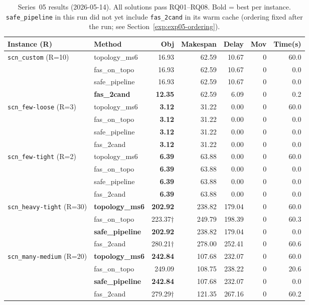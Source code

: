 \begin{table}[h]
\centering
\caption{Series~05 results (2026-05-14).  All solutions pass RQ01--RQ08.
Bold = best per instance.
\texttt{safe\_pipeline} in this run did not yet include \texttt{fas\_2cand}
in its warm cache (ordering fixed after the run; see Section~\ref{exp:exp05-ordering}).}
\label{tab:exp05}
\begin{tabular}{llrrrrr}
\toprule
Instance (R) & Method & Obj & Makespan & Delay & Mov & Time(s) \\
\midrule
\multirow{4}{*}{\texttt{scn\_custom} (R=10)}
 & topology\_ms6  & 16.93          &  62.59 &  10.67 & 0 & 60.0 \\
 & fas\_on\_topo  & 16.93          &  62.59 &  10.67 & 0 &  0.0 \\
 & safe\_pipeline & 16.93          &  62.59 &  10.67 & 0 &  0.0 \\
 & \textbf{fas\_2cand}  & \textbf{12.35} &  62.59 &   6.09 & 0 &  0.2 \\
\midrule
\multirow{4}{*}{\texttt{scn\_few-loose} (R=3)}
 & topology\_ms6  & \textbf{3.12}  &  31.22 &   0.00 & 0 & 60.0 \\
 & fas\_on\_topo  & \textbf{3.12}  &  31.22 &   0.00 & 0 &  0.0 \\
 & safe\_pipeline & \textbf{3.12}  &  31.22 &   0.00 & 0 &  0.0 \\
 & fas\_2cand     & \textbf{3.12}  &  31.22 &   0.00 & 0 &  0.0 \\
\midrule
\multirow{4}{*}{\texttt{scn\_few-tight} (R=2)}
 & topology\_ms6  & \textbf{6.39}  &  63.88 &   0.00 & 0 & 60.0 \\
 & fas\_on\_topo  & \textbf{6.39}  &  63.88 &   0.00 & 0 &  0.0 \\
 & safe\_pipeline & \textbf{6.39}  &  63.88 &   0.00 & 0 &  0.0 \\
 & fas\_2cand     & \textbf{6.39}  &  63.88 &   0.00 & 0 &  0.0 \\
\midrule
\multirow{4}{*}{\texttt{scn\_heavy-tight} (R=30)}
 & \textbf{topology\_ms6}  & \textbf{202.92} & 238.82 & 179.04 & 0 & 60.0 \\
 & fas\_on\_topo  & 223.37$\dagger$ & 249.79 & 198.39 & 0 & 60.3 \\
 & \textbf{safe\_pipeline} & \textbf{202.92} & 238.82 & 179.04 & 0 &  0.0 \\
 & fas\_2cand     & 280.21$\dagger$ & 278.00 & 252.41 & 0 & 60.6 \\
\midrule
\multirow{4}{*}{\texttt{scn\_many-medium} (R=20)}
 & \textbf{topology\_ms6}  & \textbf{242.84} & 107.68 & 232.07 & 0 & 60.0 \\
 & fas\_on\_topo  & 249.09         & 108.75 & 238.22 & 0 & 20.6 \\
 & \textbf{safe\_pipeline} & \textbf{242.84} & 107.68 & 232.07 & 0 &  0.0 \\
 & fas\_2cand     & 279.29$\dagger$ & 121.35 & 267.16 & 0 & 60.2 \\
\bottomrule
\end{tabular}
\end{table}

